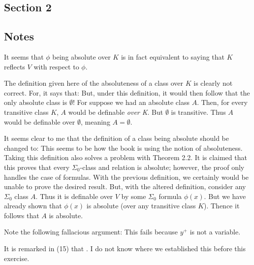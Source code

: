 \documentclass{article}
\theoremstyle{definition}
\begin{document}
\subsection*{Section 2}

\subsection*{Notes}
It seems that $\phi$ being absolute over $K$ is in fact equivalent to 
saying that $K$ reflects $V$ with respect to $\phi$.

The definition given here of the absoluteness of a class over $K$ is clearly not correct. For, it says that:
 But, under this definition, it would then follow that the only absolute class is $\emptyset$! For suppose we had an absolute class 
$A$. Then, for every transitive class $K$, $A$ would be definable \textit{over K}. But $\emptyset$ is transitive. Thus $A$ would be definable 
over $\emptyset$, meaning $A=\emptyset$.

It seems clear to me that the definition of a class being absolute should be changed to:
 This seems to be how the book is using the notion of absoluteness. Taking this definition also solves a problem with 
Theorem 2.2. It is claimed that this proves that every $\Sigma_0$-class and relation is absolute; however, the proof only handles the case of 
formulas. With the previous definition, we certainly would be unable to prove the desired result. But, with the altered definition, consider 
any $\Sigma_0$ class $A$. Thus it is definable over $V$ by some $\Sigma_0$ formula $\phi(x)$. But we have already shown that 
$\phi(x)$ is absolute (over any transitive class $K$). Thence it follows that $A$ is absolute.

Note the following fallacious argument:  This fails because $y^+$ is not a variable.

It is remarked in (15) that . I do not know where we established this before this exercise.
\end{document}
